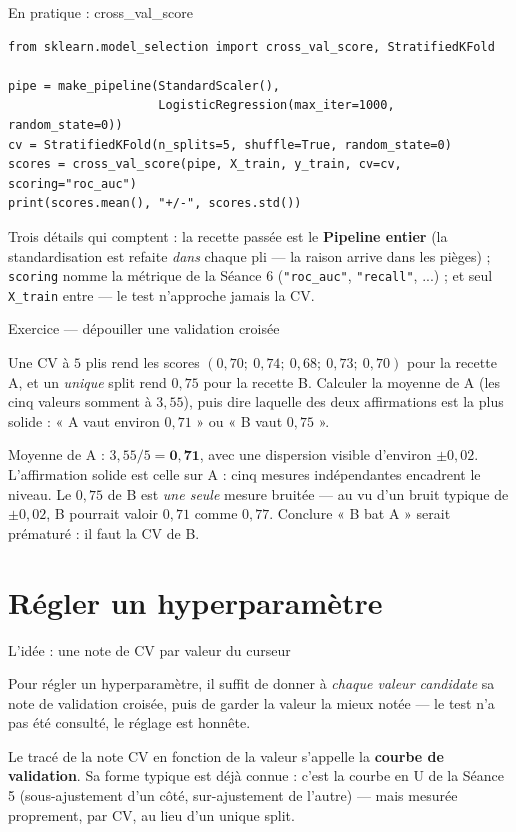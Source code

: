 \documentclass[aspectratio=169,11pt]{beamer}
\begin{document}
\begin{frame}[fragile]{En pratique : cross\_val\_score}
\begin{lstlisting}
from sklearn.model_selection import cross_val_score, StratifiedKFold

pipe = make_pipeline(StandardScaler(),
                     LogisticRegression(max_iter=1000, random_state=0))
cv = StratifiedKFold(n_splits=5, shuffle=True, random_state=0)
scores = cross_val_score(pipe, X_train, y_train, cv=cv, scoring="roc_auc")
print(scores.mean(), "+/-", scores.std())
\end{lstlisting}
{\small Trois détails qui comptent : la recette passée est le \textbf{Pipeline entier} (la standardisation est refaite \emph{dans} chaque pli — la raison arrive dans les pièges) ; \texttt{scoring} nomme la métrique de la Séance 6 (\texttt{"roc\_auc"}, \texttt{"recall"}, ...) ; et seul \texttt{X\_train} entre — le test n'approche jamais la CV.}
\end{frame}

\begin{frame}{Exercice — dépouiller une validation croisée}
\begin{ucadrec}[Énoncé]
{\small Une CV à $5$ plis rend les scores $(0{,}70;\ 0{,}74;\ 0{,}68;\ 0{,}73;\ 0{,}70)$ pour la recette A, et un \emph{unique} split rend $0{,}75$ pour la recette B. Calculer la moyenne de A (les cinq valeurs somment à $3{,}55$), puis dire laquelle des deux affirmations est la plus solide : « A vaut environ $0{,}71$ » ou « B vaut $0{,}75$ ».}
\end{ucadrec}
\pause
\begin{ucadex}[Correction]
{\small Moyenne de A : $3{,}55/5 = \mathbf{0{,}71}$, avec une dispersion visible d'environ $\pm 0{,}02$. L'affirmation solide est celle sur A : cinq mesures indépendantes encadrent le niveau. Le $0{,}75$ de B est \emph{une seule} mesure bruitée — au vu d'un bruit typique de $\pm 0{,}02$, B pourrait valoir $0{,}71$ comme $0{,}77$. Conclure « B bat A » serait prématuré : il faut la CV de B.}
\end{ucadex}
\end{frame}

\section{Régler un hyperparamètre}

\begin{frame}{L'idée : une note de CV par valeur du curseur}
\begin{ucaddef}
{\small Pour régler un hyperparamètre, il suffit de donner à \emph{chaque valeur candidate} sa note de validation croisée, puis de garder la valeur la mieux notée — le test n'a pas été consulté, le réglage est honnête.}
\end{ucaddef}
{\small Le tracé de la note CV en fonction de la valeur s'appelle la \textbf{courbe de validation}. Sa forme typique est déjà connue : c'est la courbe en U de la Séance 5 (sous-ajustement d'un côté, sur-ajustement de l'autre) — mais mesurée proprement, par CV, au lieu d'un unique split.}
\end{frame}
\end{document}
